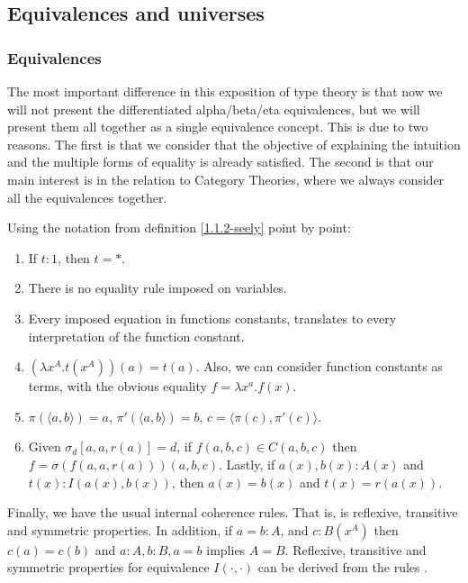 \subsection{Equivalences and universes}
\subsubsection{Equivalences}

The most important difference in this exposition of type theory is that now we will not present the differentiated alpha/beta/eta equivalences, but we will present them all together as a single equivalence concept. This is due to two reasons. The first is that we consider that the objective of explaining the intuition and the multiple forms of equality is already satisfied. The second is that our main interest is in the relation to Category Theories, where we always consider all the equivalences together.


\begin{definition} \label{def:ml-equality}
  Using the notation from definition \ref{1.1.2-seely} point by point:
  \begin{enumerate}
  \item If $t:1$, then $t=*$.
  \item There is no equality rule imposed on variables.
  \item Every imposed equation in functions constants, translates to every interpretation of the function constant.
  \item $(\lambda x^A.t(x^A))(a) =  t(a)$. Also, we can consider function constants as terms, with the obvious equality $f = \lambda x^a.f(x)$.
  \item $\pi(\langle a,b\rangle) = a$,  $\pi'(\langle a, b\rangle) = b$, $c=\langle \pi(c),\pi'(c)\rangle$.
  \item Given $\sigma_d[a,a,r(a)]=d$, if $f(a,b,c)\in C(a,b,c)$ then $f=\sigma(f(a,a,r(a)))(a,b,c)$. Lastly, if $a(x), b(x):A(x)$ and $t(x) : I(a(x),b(x))$, then $a(x)=b(x)$ and $t(x)=r(a(x))$.
  \end{enumerate}

  Finally, we have the  usual internal coherence rules. That is, is reflexive, transitive and symmetric properties. In addition, if $a=b : A$, and $c:B(x^A)$ then $c(a)=c(b)$ and $a:A, b:B, a=b$ implies $A=B$. Reflexive, transitive and symmetric properties for equivalence $I(\cdot, \cdot)$ can be derived from the rules \cite[1.3]{seely1984locally}.
\end{definition}

